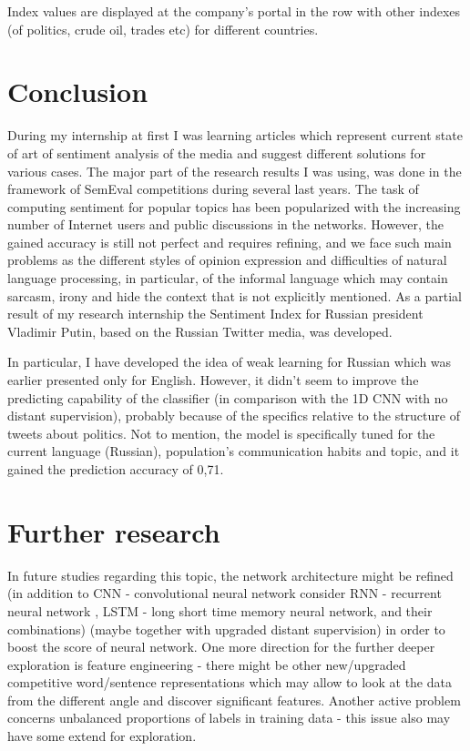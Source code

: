 \documentclass[12pt,a4paper]{article}
\begin{document}
Index values are displayed at the company's portal in the row with other indexes (of politics, crude oil, trades etc) for different countries.

\section{Conclusion}
During my internship at first I was learning articles which represent current state of art of sentiment analysis of the media and suggest different solutions for various cases. The major part of the research results I was using, was done in the framework of SemEval competitions during several last years. The task of computing sentiment for popular topics has been popularized with the increasing number of Internet users and public discussions in the networks. However, the gained accuracy is still not perfect and requires refining, and we face such main problems as the different styles of opinion expression and difficulties of natural language processing, in particular, of the informal language which may contain sarcasm, irony and hide the context that is not explicitly mentioned. 
As a partial result of my research internship the Sentiment Index for Russian president Vladimir Putin, based on the Russian Twitter media, was developed.

In particular, I have developed the idea of weak learning for Russian which was earlier presented only for English. However, it didn't seem to improve the predicting capability of the classifier (in comparison with the 1D CNN with no distant supervision), probably because of the specifics relative to the structure of tweets about politics.
Not to mention, the model is specifically tuned for the current language (Russian), population's communication habits and topic, and it gained the prediction accuracy of 0,71.

\section{Further research}
In future studies regarding this topic, the network architecture might be refined (in addition to CNN - convolutional neural network consider RNN - recurrent neural network , LSTM - long short time memory neural network, and their combinations) (maybe together with upgraded distant supervision) in order to boost the score of neural network.
One more direction for the further deeper exploration is feature engineering - there might be other new/upgraded competitive word/sentence representations which may allow to look at the data from the different angle and discover significant features. Another active problem concerns unbalanced proportions of labels in training data - this issue also may have some extend for exploration.
\end{document}
